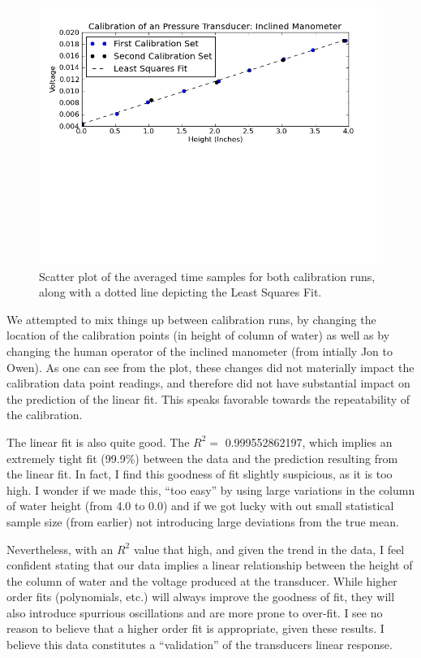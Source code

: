 \documentclass{article}
\begin{document}
  \begin{figure}[!htb]
   \begin{center}
    \includegraphics[width = 12 cm]{figs/inclined.png}
    \caption{Scatter plot of the averaged time samples for both
    calibration runs, along with a dotted line depicting the Least
    Squares Fit.}
    \label{inclined}
   \end{center}
  \end{figure}

We attempted to mix things up between calibration runs, by changing the
location of the calibration points (in height of column of water) as
well as by changing the human operator of the inclined manometer (from
intially Jon to Owen). As one can see from the plot, these changes did
not materially impact the calibration data point readings, and therefore
did not have substantial impact on the prediction of the linear
fit. This speaks favorable towards the repeatability of the calibration.

The
linear fit is also quite good. The $R^2 =$ 0.999552862197, which implies
an extremely tight fit (99.9\%) between the data and the prediction resulting
from the linear fit. In fact, I find this goodness of fit slightly
suspicious, as it is too high. I wonder if we made this, ``too easy'' by
using large variations in the column of water height (from 4.0 to 0.0)
and if we got lucky with out small statistical sample size (from
earlier) not introducing large deviations from the true mean. 

Nevertheless, with an $R^2$ value that high, and given the trend in the
data, I feel confident stating that our data implies a linear
relationship between the height of the column of water and the voltage
produced at the transducer. While higher order fits (polynomials, etc.)
will always improve the goodness of fit, they will also introduce
spurrious oscillations and are more prone to over-fit. I see no reason
to believe that a higher order fit is appropriate, given these
results. I believe this data constitutes a ``validation'' of the
transducers linear response. 
\end{document}
